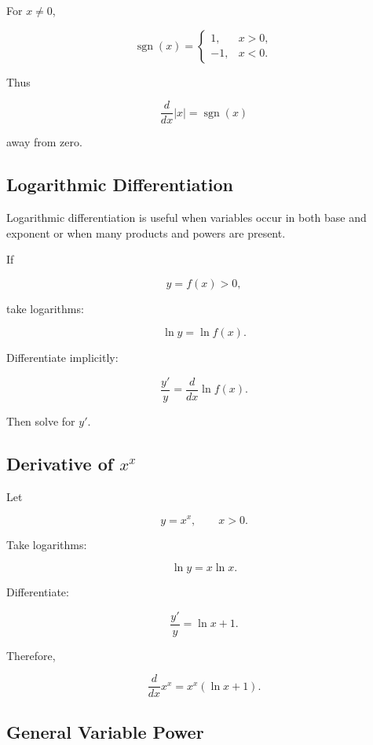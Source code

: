 For \(x\neq0\),

\[
\boxed{
\operatorname{sgn}(x)
=
\begin{cases}
1, & x>0,\\
-1, & x<0.
\end{cases}
}
\]

Thus

\[
\boxed{
\frac{d}{dx}|x|
=
\operatorname{sgn}(x)
}
\]

away from zero.

\subsection{Logarithmic Differentiation}
\label{subsec:logarithmic-differentiation-reference}

Logarithmic differentiation is useful when variables occur in both base and
exponent or when many products and powers are present.

If

\[
y=f(x)>0,
\]

take logarithms:

\[
\ln y
=
\ln f(x).
\]

Differentiate implicitly:

\[
\boxed{
\frac{y'}{y}
=
\frac{d}{dx}
\ln f(x).
}
\]

Then solve for \(y'\).

\subsection{Derivative of \(x^x\)}
\label{subsec:x-to-x-derivative}

Let

\[
y=x^x,
\qquad
x>0.
\]

Take logarithms:

\[
\ln y
=
x\ln x.
\]

Differentiate:

\[
\frac{y'}{y}
=
\ln x+1.
\]

Therefore,

\[
\boxed{
\frac{d}{dx}x^x
=
x^x(\ln x+1).
}
\]

\subsection{General Variable Power}
\label{subsec:general-variable-power-derivative}

